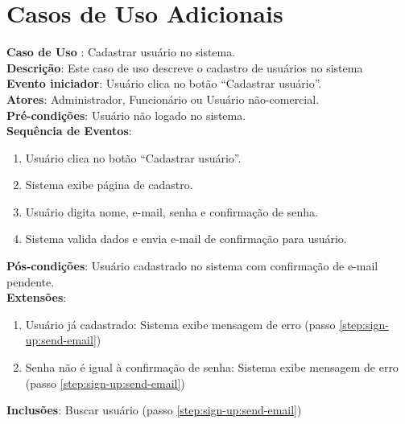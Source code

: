 \documentclass[]{politex}
\begin{document}
\apendice
\chapter{Casos de Uso Adicionais}\label{additional-case-uses}

\noindent \textbf{Caso de Uso }: Cadastrar usuário no
sistema.  \\
\textbf{Descrição}: Este caso de uso descreve o cadastro de usuários no
sistema \\
\textbf{Evento iniciador}: Usuário clica no botão ``Cadastrar usuário''. \\
\textbf{Atores}: Administrador, Funcionário ou Usuário não-comercial. \\
\textbf{Pré-condições}: Usuário não logado no sistema. \\
\textbf{Sequência de Eventos}:
\begin{enumerate}
\item Usuário clica no botão ``Cadastrar usuário''.
\item Sistema exibe página de cadastro.
\item Usuário digita nome, e-mail, senha e confirmação de senha.
\item\label{step:sign-up:send-email} Sistema valida dados e envia e-mail de
confirmação para usuário.
\end{enumerate}
\textbf{Pós-condições}: Usuário cadastrado no sistema com confirmação de e-mail
pendente. \\
\textbf{Extensões}:
\begin{enumerate}
\item Usuário já cadastrado: Sistema exibe mensagem de erro (passo
\ref{step:sign-up:send-email})
\item Senha não é igual à confirmação de senha: Sistema exibe mensagem de erro
(passo \ref{step:sign-up:send-email})
\end{enumerate}
\textbf{Inclusões}: Buscar usuário (passo \ref{step:sign-up:send-email}) \\
\end{document}
